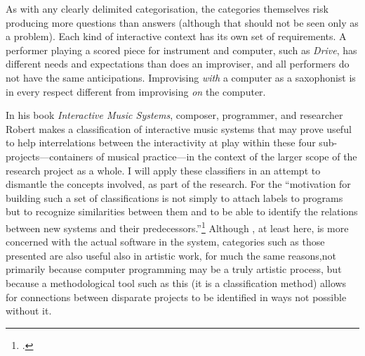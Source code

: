 As with any clearly delimited categorisation, the categories themselves risk producing more questions than answers (although that should not be seen only as a problem). Each kind of interactive context has its own set of requirements. A performer playing a scored piece for instrument and computer, such as \emph{Drive}, has different needs and expectations than does an improviser, and all performers do not have the same anticipations. Improvising \emph{with} a computer as a saxophonist is in every respect different from improvising \emph{on} the computer. 

In his book \emph{Interactive Music Systems}, composer, programmer, and researcher Robert \citeauthor{rowe} makes a classification of interactive music systems that may prove useful to help interrelations between the interactivity at play within these four sub-projects---containers of musical practice---in the context of the larger scope of the research project as a whole. I will apply these classifiers in an attempt to dismantle the concepts involved, as part of the research. For \citeauthor{rowe} the ``motivation for building such a set of classifications is not simply to attach labels to programs but to recognize similarities between them and to be able to identify the relations between new systems and their predecessors.''\footcite[6]{rowe} Although \citeauthor{rowe}, at least here, is more concerned with the actual software in the system, categories such as those presented are also useful also in artistic work, for much the same reasons,not primarily because computer programming may be a truly artistic process, but because a methodological tool such as this (it is a classification method) allows for connections between disparate  projects to be identified in ways not possible without it.

